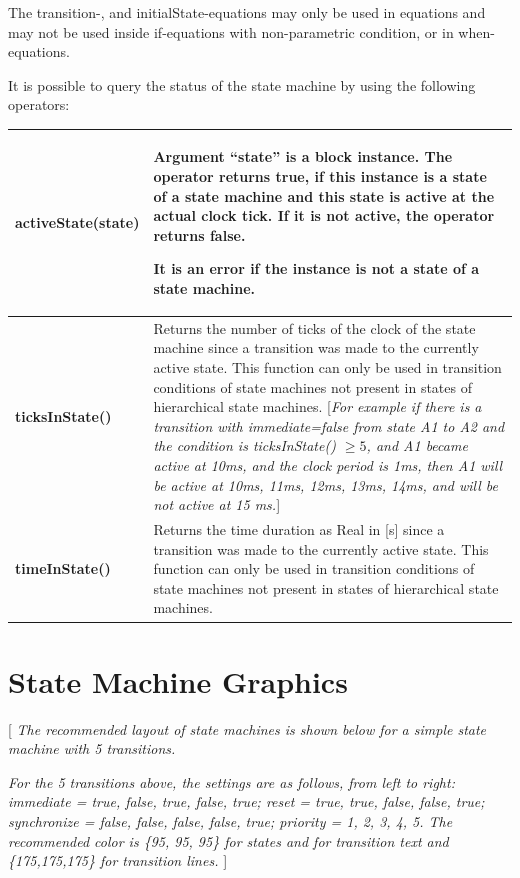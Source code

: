 \documentclass[10pt,a4paper]{report}
\def\doublelabel#1{\label{#1}\hypertarget{#1}{}}
\begin{document}
The transition-, and initialState-equations may only be used in
equations and may not be used inside if-equations with non-parametric
condition, or in when-equations.

It is possible to query the status of the state machine by using the
following operators:

\begin{longtable}[]{@{}ll@{}}
\endhead
\hline
\textbf{activeState}(state)&
Argument ``state'' is a block instance. The operator returns
\textbf{true}, if this instance is a state of a state machine and this
state is active at the actual clock tick. If it is not active, the
operator returns \textbf{false}.

It is an error if the instance is not a state of a state machine.\\ \hline
\textbf{ticksInState()} & Returns the number of ticks of the clock of
the state machine since a transition was made to the currently active
state. This function can only be used in transition conditions of state
machines not present in states of hierarchical state machines.
{[}\emph{For example if there is a transition with immediate=false from
state A1 to A2 and the condition is ticksInState() $\ge 5$, and A1 became
active at 10ms, and the clock period is 1ms, then A1 will be active at
10ms, 11ms, 12ms, 13ms, 14ms, and will be not active at 15 ms.}{]}\\ \hline
\textbf{timeInState()} & Returns the time duration as Real in {[}s{]}
since a transition was made to the currently active state. This function
can only be used in transition conditions of state machines not present
in states of hierarchical state machines.\\ \hline

\end{longtable}

\section{State Machine Graphics}\doublelabel{state-machine-graphics}

{[} \emph{The recommended layout of state machines is shown below for a
simple state machine with 5 transitions. }

\emph{For
the 5 transitions above, the settings are as follows, from left to
right: immediate = true, false, true, false, true; reset = true, true,
false, false, true; synchronize = false, false, false, false, true;
priority = 1, 2, 3, 4, 5. The recommended color is \{95, 95, 95\} for
states and for transition text and \{175,175,175\} for transition
lines.} {]}
\end{document}
